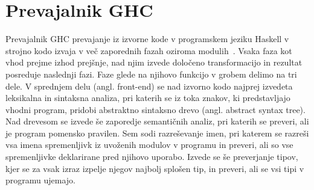 \section{Prevajalnik GHC}
\label{sec:prevajalnik-ghc}

Prevajalnik GHC prevajanje iz izvorne kode v programskem jeziku Haskell v strojno kodo izvaja v več zaporednih fazah oziroma modulih~\cite{jones1993glasgow, brown2012architecture}. Vsaka faza kot vhod prejme izhod prejšnje, nad njim izvede določeno transformacijo in rezultat posreduje naslednji fazi. Faze glede na njihovo funkcijo v grobem delimo na tri dele. V sprednjem delu (angl. front-end) se nad izvorno kodo najprej izvedeta leksikalna in sintaksna analiza, pri katerih se iz toka znakov, ki predstavljajo vhodni program, pridobi abstraktno sintaksno drevo (angl. abstract syntax tree). Nad drevesom se izvede še zaporedje semantičnih analiz, pri katerih se preveri, ali je program pomensko pravilen. Sem sodi razreševanje imen, pri katerem se razreši vsa imena spremenljivk iz uvoženih modulov v programu in preveri, ali so vse spremenljivke deklarirane pred njihovo uporabo. Izvede se še preverjanje tipov, kjer se za vsak izraz izpelje njegov najbolj splošen tip, in preveri, ali se vsi tipi v programu ujemajo.

